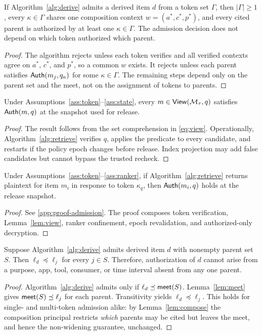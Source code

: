 \begin{lemma}
\label{lem:compose}
If Algorithm~\ref{alg:derive} admits a derived item $d$ from a token set $\Gamma$, then $|\Gamma|\ge 1$, every $\kappa\in\Gamma$ shares one composition context $w=(a^*,c^*,p^*)$, and every cited parent is authorized by at least one $\kappa\in\Gamma$. The admission decision does not depend on which token authorized which parent.
\end{lemma}
\begin{proof}
The algorithm rejects unless each token verifies and all verified contexts agree on $a^*$, $c^*$, and $p^*$, so a common $w$ exists. It rejects unless each parent satisfies $\mathsf{Auth}(m_j,q_\kappa)$ for some $\kappa\in\Gamma$. The remaining steps depend only on the parent set and the meet, not on the assignment of tokens to parents.
\end{proof}

\begin{lemma}
\label{lem:view}
Under Assumptions~\ref{ass:token}--\ref{ass:state}, every $m\in\mathsf{View}(\mathcal{M}_\tau,q)$ satisfies $\mathsf{Auth}(m,q)$ at the snapshot used for release.
\end{lemma}
\begin{proof}
The result follows from the set comprehension in \cref{eq:view}. Operationally, Algorithm~\ref{alg:retrieve} verifies $q$, applies the predicate to every candidate, and restarts if the policy epoch changes before release. Index projection may add false candidates but cannot bypass the trusted recheck.
\end{proof}

\begin{theorem}
\label{thm:admission}
Under Assumptions~\ref{ass:token}--\ref{ass:ranker}, if Algorithm~\ref{alg:retrieve} returns plaintext for item $m_i$ in response to token $\kappa_q$, then $\mathsf{Auth}(m_i,q)$ holds at the release snapshot.
\end{theorem}
\begin{proof}
See \cref{app:proof-admission}. The proof composes token verification, Lemma~\ref{lem:view}, ranker confinement, epoch revalidation, and authorized-only decryption.
\end{proof}

\begin{theorem}
\label{thm:derived}
Suppose Algorithm~\ref{alg:derive} admits derived item $d$ with nonempty parent set $S$. Then $\ell_d\preceq\ell_j$ for every $j\in S$. Therefore, authorization of $d$ cannot arise from a purpose, app, tool, consumer, or time interval absent from any one parent.
\end{theorem}
\begin{proof}
Algorithm~\ref{alg:derive} admits only if $\ell_d\preceq\mathsf{meet}(S)$. Lemma~\ref{lem:meet} gives $\mathsf{meet}(S)\preceq\ell_j$ for each parent. Transitivity yields $\ell_d\preceq\ell_j$. This holds for single- and multi-token admission alike: by Lemma~\ref{lem:compose} the composition principal restricts \emph{which} parents may be cited but leaves the meet, and hence the non-widening guarantee, unchanged.
\end{proof}


